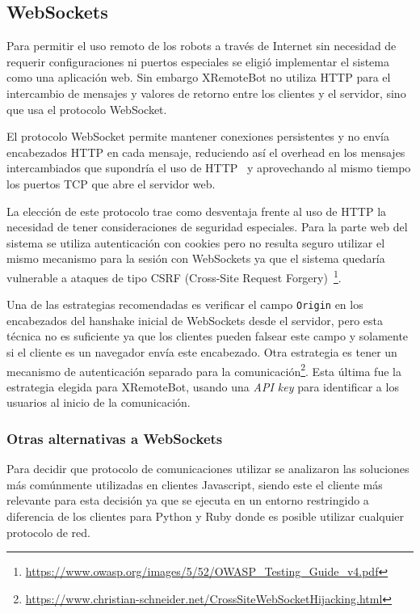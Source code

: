 \subsection{WebSockets}\label{sec:websockets}

Para permitir el uso remoto de los robots a través de Internet sin necesidad
de requerir configuraciones ni puertos especiales se eligió implementar el
sistema como una
aplicación web. Sin embargo XRemoteBot
no utiliza HTTP para el intercambio de
mensajes y valores de retorno entre los clientes y el servidor, sino
que usa el
protocolo WebSocket.

El protocolo WebSocket permite mantener conexiones persistentes y no envía
encabezados HTTP en cada mensaje, reduciendo así el overhead en los mensajes
intercambiados que supondría el uso de HTTP~\citep{wang_2013} y aprovechando al
mismo tiempo los puertos TCP que abre el servidor web.

La elección de este protocolo trae como desventaja frente al uso de HTTP la
necesidad de tener consideraciones de seguridad especiales. Para la parte
web del sistema se utiliza autenticación con cookies pero no resulta seguro
utilizar el mismo mecanismo para la sesión con WebSockets ya que el sistema
quedaría vulnerable a ataques de tipo CSRF (Cross-Site Request
Forgery)~\citep{owasp_2014}\footnote{
\url{https://www.owasp.org/images/5/52/OWASP_Testing_Guide_v4.pdf}}.

Una de las estrategias recomendadas es verificar el campo \texttt{Origin}
en los encabezados del hanshake inicial de WebSockets
desde el servidor, pero esta técnica no es suficiente ya que los
clientes pueden falsear este campo y solamente si el cliente es un navegador
envía este encabezado.
Otra estrategia es tener un mecanismo de autenticación
separado para la comunicación\footnote{\url{https://www.christian-schneider.net/CrossSiteWebSocketHijacking.html}}.
Esta última fue la estrategia elegida para XRemoteBot, usando una \textit{API key}
para identificar a los usuarios al inicio de la comunicación.

\subsubsection{Otras alternativas a WebSockets}
Para decidir que protocolo de comunicaciones utilizar se analizaron
las soluciones más comúnmente utilizadas en clientes Javascript, siendo
este el cliente más relevante para esta decisión ya que se ejecuta en
un entorno restringido a diferencia de los clientes para Python y Ruby donde
es posible utilizar cualquier protocolo de red.

